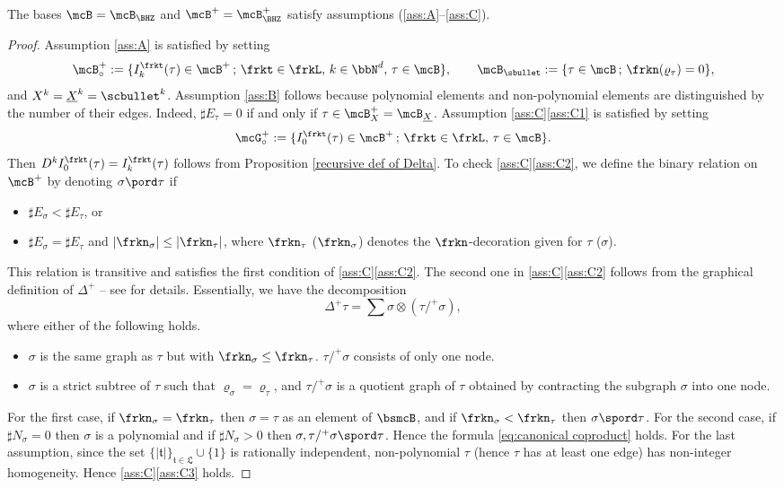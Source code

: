 \begin{thm}\label{BHZ-ABC}
The bases $\mcB=\mcB_{\BHZ}$ and $\mcB^+=\mcB_{\BHZ}^+$ satisfy assumptions \textup{(\ref{ass:A}--\ref{ass:C})}.
\end{thm}

\begin{proof}
Assumption \eqref{ass:A} is satisfied by setting
\[
\mcB_\circ^+:=\{I_k^{\frkt}(\tau)\in\mcB^+\,;\, \frkt\in\frkL,\, k\in\bbN^d,\, \tau\in\mcB\},\qquad
\mcB_\sbullet:=\{\tau\in\mcB\,;\, \frkn(\varrho_\tau)=0\},
\]
and $X^k=\underline{X}^k=\scbullet^k$.
Assumption \eqref{ass:B} follows because polynomial elements and non-polynomial elements are distinguished by the number of their edges. Indeed, $\sharp E_\tau=0$ if and only if $\tau\in\mcB_X^+=\mcB_{\underline{X}}$.
Assumption \ref{ass:C}\eqref{ass:C1} is satisfied by setting
\[
\mcG_\circ^+:=\{I_0^{\frkt}(\tau)\in\mcB^+\,;\, \frkt\in\frkL,\, \tau\in\mcB\}.
\]
Then $D^kI_0^{\frkt}(\tau)=I_k^{\frkt}(\tau)$ follows from Proposition \ref{recursive def of Delta}.
To check \ref{ass:C}\eqref{ass:C2}, we define the binary relation on $\mcB^+$ by denoting $\sigma\pord\tau$ if
\begin{itemize}
\item $\sharp E_\sigma<\sharp E_\tau$, or
\item $\sharp E_\sigma=\sharp E_\tau$ and $|\frkn_\sigma|\le|\frkn_\tau|$, where $\frkn_\tau$ (\resp $\frkn_\sigma$) denotes the $\frkn$-decoration given for $\tau$ (\resp $\sigma$).
\end{itemize}
This relation is transitive and satisfies the first condition of \ref{ass:C}\eqref{ass:C2}.
The second one in \ref{ass:C}\eqref{ass:C2} follows from the graphical definition of $\Delta^+$ -- see \cite[\S2]{BHZ} for details. Essentially, we have the decomposition
\[
\Delta^+\tau=\sum\sigma\otimes(\tau/^+\sigma),
\]
where either of the following holds.
\begin{itemize}
\item $\sigma$ is the same graph as $\tau$ but with $\frkn_\sigma\le\frkn_\tau$.
$\tau/^+\sigma$ consists of only one node.
\item $\sigma$ is a strict subtree of $\tau$ such that $\varrho_\sigma=\varrho_\tau$, and $\tau/^+\sigma$ is a quotient graph of $\tau$ obtained by contracting the subgraph $\sigma$ into one node.
\end{itemize}
For the first case, if $\frkn_\sigma=\frkn_\tau$ then $\sigma=\tau$ as an element of $\bsmcB$, and if $\frkn_\sigma<\frkn_\tau$ then $\sigma\spord\tau$.
For the second case, if $\sharp N_\sigma=0$ then $\sigma$ is a polynomial and if $\sharp N_\sigma>0$ then $\sigma,\tau/^+\sigma\spord\tau$.
Hence the formula \eqref{eq:canonical coproduct} holds.
For the last assumption, since the set $\{|\mathfrak{t}|\}_{\mathfrak{t}\in\mathfrak{L}}\cup\{1\}$ is rationally independent, non-polynomial $\tau$ (hence $\tau$ has at least one edge) has non-integer homogeneity. Hence \ref{ass:C}\eqref{ass:C3} holds.
\end{proof}

